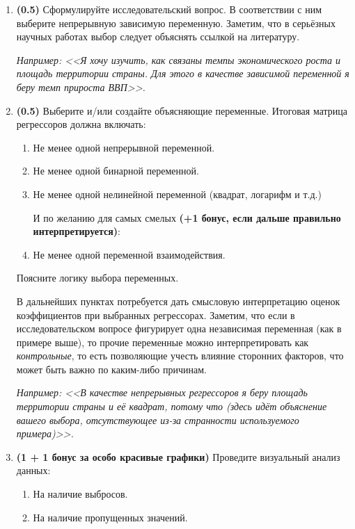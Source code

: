 \documentclass[10pt, a4paper]{extarticle}
\begin{document}
\begin{enumerate}
	\item \textbf{(0.5)} Сформулируйте исследовательский вопрос. В соответствии с ним выберите непрерывную зависимую переменную. Заметим, что в серьёзных научных работах выбор следует объяснять ссылкой на литературу.
	
	\textit{Например: <<Я хочу изучить, как связаны темпы экономического роста и площадь территории страны. Для этого в качестве зависимой переменной я беру темп прироста ВВП>>.}
	\item \textbf{(0.5)} Выберите и/или создайте объясняющие переменные. Итоговая матрица регрессоров должна включать:
	\begin{enumerate}
		\item Не менее одной непрерывной переменной.
		\item Не менее одной бинарной переменной.
		\item Не менее одной нелинейной переменной (квадрат, логарифм и т.д.)
		
		\vspace{1em}
		\hspace{-2em}И по желанию для самых смелых \textbf{(+1 бонус, если дальше правильно интерпретируется)}:
		
		\vspace{0.5em}
		\item Не менее одной переменной взаимодействия.
	\end{enumerate}
	Поясните логику выбора переменных.
	
	В дальнейших пунктах потребуется дать смысловую интерпретацию оценок коэффициентов при выбранных регрессорах. Заметим, что если в исследовательском вопросе фигурирует одна независимая переменная (как в примере выше), то прочие переменные можно интерпретировать как \textit{контрольные}, то есть позволяющие учесть влияние сторонних факторов, что может быть важно по каким-либо причинам. 
	
	\textit{Например: <<В качестве непрерывных регрессоров я беру площадь территории страны и её квадрат, потому что (здесь идёт объяснение вашего выбора, отсутствующее из-за странности используемого примера)>>.}
	
	\item \textbf{(1 + 1 бонус за особо красивые графики)} Проведите визуальный анализ данных:
	\begin{enumerate}
		\item На наличие выбросов.
		\item На наличие пропущенных значений.
	\end{enumerate}
	

\end{enumerate}
\end{document}
